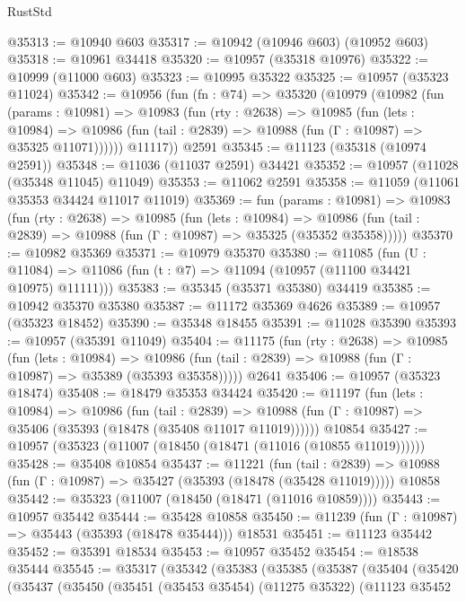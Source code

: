 \begin{lexlean}{RustStd}
\begin{coremodule}
@35313 := @10940 @603
@35317 := @10942 (@10946 @603) (@10952 @603)
@35318 := @10961 @34418
@35320 := @10957 (@35318 @10976)
@35322 := @10999 (@11000 @603)
@35323 := @10995 @35322
@35325 := @10957 (@35323 @11024)
@35342 := @10956
    (fun (fn : @74) =>
    @35320
      (@10979
        (@10982
          (fun (params : @10981) =>
          @10983
            (fun (rty : @2638) =>
            @10985
              (fun (lets : @10984) =>
              @10986 (fun (tail : @2839) => @10988 (fun (Γ : @10987) => @35325 @11071))))))
        @11117))
    @2591
@35345 := @11123 (@35318 (@10974 @2591))
@35348 := @11036 (@11037 @2591) @34421
@35352 := @10957 (@11028 (@35348 @11045) @11049)
@35353 := @11062 @2591
@35358 := @11059 (@11061 @35353 @34424 @11017 @11019)
@35369 := fun (params : @10981) =>
  @10983
    (fun (rty : @2638) =>
    @10985
      (fun (lets : @10984) =>
      @10986 (fun (tail : @2839) => @10988 (fun (Γ : @10987) => @35325 (@35352 @35358)))))
@35370 := @10982 @35369
@35371 := @10979 @35370
@35380 := @11085
    (fun (U : @11084) => @11086 (fun (t : @7) => @11094 (@10957 (@11100 @34421 @10975) @11111)))
@35383 := @35345 (@35371 @35380) @34419
@35385 := @10942 @35370 @35380
@35387 := @11172 @35369 @4626
@35389 := @10957 (@35323 @18452)
@35390 := @35348 @18455
@35391 := @11028 @35390
@35393 := @10957 (@35391 @11049)
@35404 := @11175
    (fun (rty : @2638) =>
    @10985
      (fun (lets : @10984) =>
      @10986 (fun (tail : @2839) => @10988 (fun (Γ : @10987) => @35389 (@35393 @35358)))))
    @2641
@35406 := @10957 (@35323 @18474)
@35408 := @18479 @35353 @34424
@35420 := @11197
    (fun (lets : @10984) =>
    @10986
      (fun (tail : @2839) =>
      @10988 (fun (Γ : @10987) => @35406 (@35393 (@18478 (@35408 @11017 @11019))))))
    @10854
@35427 := @10957 (@35323 (@11007 (@18450 (@18471 (@11016 (@10855 @11019))))))
@35428 := @35408 @10854
@35437 := @11221
    (fun (tail : @2839) => @10988 (fun (Γ : @10987) => @35427 (@35393 (@18478 (@35428 @11019)))))
    @10858
@35442 := @35323 (@11007 (@18450 (@18471 (@11016 @10859))))
@35443 := @10957 @35442
@35444 := @35428 @10858
@35450 := @11239 (fun (Γ : @10987) => @35443 (@35393 (@18478 @35444))) @18531
@35451 := @11123 @35442
@35452 := @35391 @18534
@35453 := @10957 @35452
@35454 := @18538 @35444
@35545 := @35317
    (@35342
      (@35383
        (@35385
          (@35387
            (@35404
              (@35420
                (@35437
                  (@35450
                    (@35451
                      (@35453 @35454)
                      (@11275 @35322)
                      (@11123
                        @35452

\end{coremodule}
\end{lexlean}
